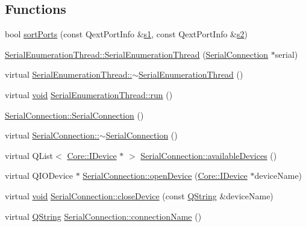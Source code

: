 \subsection*{\-Functions}
\begin{DoxyCompactItemize}
\item 
bool \hyperlink{group___serial_plugin_gad78f86e2b854b6285de51dbf32711129}{sort\-Ports} (const \-Qext\-Port\-Info \&\hyperlink{_o_p_plots_8m_a2f07e0f444810cc4e54ee2be2ce0ac65}{s1}, const \-Qext\-Port\-Info \&\hyperlink{_o_p_plots_8m_a2e63e71737e8b6802b81f6a7c5ca6a0a}{s2})
\item 
\hyperlink{group___serial_plugin_ga289f1853507d6f6b1bfdd1dd31284c31}{\-Serial\-Enumeration\-Thread\-::\-Serial\-Enumeration\-Thread} (\hyperlink{class_serial_connection}{\-Serial\-Connection} $\ast$serial)
\item 
virtual \hyperlink{group___serial_plugin_gaf247ad3a1a6b6c85a885aaaa1675cd48}{\-Serial\-Enumeration\-Thread\-::$\sim$\-Serial\-Enumeration\-Thread} ()
\item 
virtual \hyperlink{group___u_a_v_objects_plugin_ga444cf2ff3f0ecbe028adce838d373f5c}{void} \hyperlink{group___serial_plugin_gab90979605ec84bd0383575c2b10f18d0}{\-Serial\-Enumeration\-Thread\-::run} ()
\item 
\hyperlink{group___serial_plugin_gaad6479d49b3483b42c19868c9efcef01}{\-Serial\-Connection\-::\-Serial\-Connection} ()
\item 
virtual \hyperlink{group___serial_plugin_gae73749bb08c2f53f467809cb6c0a3fc8}{\-Serial\-Connection\-::$\sim$\-Serial\-Connection} ()
\item 
virtual \-Q\-List$<$ \hyperlink{class_core_1_1_i_device}{\-Core\-::\-I\-Device} $\ast$ $>$ \hyperlink{group___serial_plugin_ga35f8b088eb3166e3e81cc71809806085}{\-Serial\-Connection\-::available\-Devices} ()
\item 
virtual \-Q\-I\-O\-Device $\ast$ \hyperlink{group___serial_plugin_gacbed38aeba722578f369ad9b4ef2b822}{\-Serial\-Connection\-::open\-Device} (\hyperlink{class_core_1_1_i_device}{\-Core\-::\-I\-Device} $\ast$device\-Name)
\item 
virtual \hyperlink{group___u_a_v_objects_plugin_ga444cf2ff3f0ecbe028adce838d373f5c}{void} \hyperlink{group___serial_plugin_gaa5933c2426d549fd1621d1e29529e517}{\-Serial\-Connection\-::close\-Device} (const \hyperlink{group___u_a_v_objects_plugin_gab9d252f49c333c94a72f97ce3105a32d}{\-Q\-String} \&device\-Name)
\item 
virtual \hyperlink{group___u_a_v_objects_plugin_gab9d252f49c333c94a72f97ce3105a32d}{\-Q\-String} \hyperlink{group___serial_plugin_ga4b91aa098a25069f0590a25687bdf25b}{\-Serial\-Connection\-::connection\-Name} ()

\end{DoxyCompactItemize}
